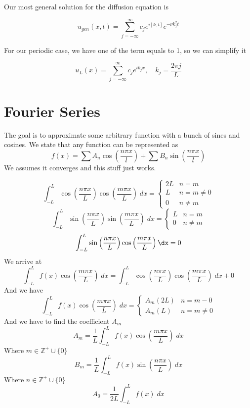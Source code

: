 \documentclass[12pt]{book}
\newcommand{\Z}{\mathbb{Z}}
\newcommand{\sqbkt}[1]{\left[ #1 \right]}
\newcommand{\paren}[1]{\left( #1 \right)}
\newcommand{\nonneg}{\Z^+ \cup \{0\}}
\begin{document}
Our most general solution for the diffusion equation is
\begin{large}
    \[
    u_{gen}(x,t) = \sum_{j=-\infty}^{\infty}c_je^{i\sqbkt{k,t}}e^{-\nu k_j^2 t}
    \]
\end{large}
For our periodic case, we have one of the term equals to 1, so we can simplify it
\begin{large}
    \[
u_L(x) = \sum_{j=-\infty}^{\infty}c_j e^{ik_j x}, \quad k_j = \frac{2\pi j}{L}
\]
\end{large}


\section{Fourier Series}
The goal is to approximate some arbitrary function with a bunch of sines and cosines. We state that any function can be represented as
\[
f(x) = \sum A_n\cos\paren{\frac{n\pi x}{l}} + \sum B_n\sin\paren{\frac{n\pi x}{l}}
\]
We assumes it converges and this stuff just works. 

\[
\int_{-L}^{L} \cos\paren{\frac{n\pi x}{L}}\cos\paren{\frac{m\pi x}{L}} \; dx = \begin{cases}
    2L & n=m\\
    L & n = m\neq 0\\
    0 & n\neq m
\end{cases}
\]
\[
\int_{-L}^{L} \sin\paren{\frac{n\pi x}{L}}\sin\paren{\frac{m\pi x}{L}} \;dx = \begin{cases}
    L & n = m\\
    0 & n\neq m
\end{cases}
\]
\[
\int_{-L}^{L} \sin\paren{\frac{n\pi x}{L}}\cos\paren{\frac{m\pi x}{L}} \dx =  0
\]
We arrive at
\[
\int_{-L}^{L} f(x) \cos\paren{\frac{m\pi x}{L}}\; dx = \int_{-L}^{L} \cos\paren{\frac{n\pi x}{L}}\cos\paren{\frac{m\pi x}{L}} \; dx + 0
\]
And we have
\[
\int_{-L}^{L} f(x) \cos\paren{\frac{m\pi x}{L}}\; dx = \begin{cases}
    A_m(2L) & n=m-0\\
    A_m(L) & n=m\neq 0
\end{cases}
\]
And we have to find the coefficient $A_m$
\[
A_m = \frac{1}{L}\int_{-L}^{L}f(x)\cos\paren{\frac{m\pi x}{L}} \; dx 
\]
Where $m\in\nonneg$
\[
B_m = \frac{1}{L}\int_{-L}^{L}f(x)\sin\paren{\frac{n\pi x}{L}} \; dx 
\]
Where $n \in \nonneg$
\[
A_0 = \frac{1}{2L}\int_{-L}^{L} f(x) \; dx 
\]
\end{document}
